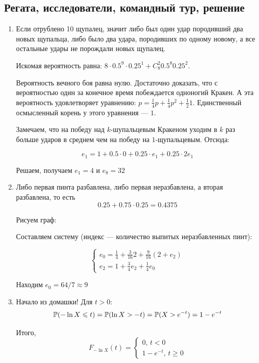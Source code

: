 \documentclass[12pt, a4paper]{article}\usepackage[]{graphicx}\usepackage[]{color}
\begin{document}
				\subsection{Регата, исследователи, командный тур, решение}

				\begin{enumerate}

					\item Если отрублено 10 щупалец, значит либо был один удар породивший два новых щупальца, либо было два удара, породивших по одному новому, а все остальные удары не порождали новых щупалец.

					Искомая вероятность равна: $8\cdot 0.5^9 \cdot 0.25^1 + C_8^2 0.5^8 0.25^2$.

					Вероятность вечного боя равна нулю. Достаточно доказать, что с вероятностью один за конечное время побеждается одноногий Кракен. А эта вероятность удовлетворяет уравнению: $p=\frac{1}{4}p + \frac{1}{4}p^2 + \frac{1}{2} 1$. Единственный осмысленный корень у этого уравнения — $1$.

					Замечаем, что на победу над $k$-шупальцевым Кракеном уходим в $k$ раз больше ударов в среднем чем на победу на $1$-щупальцевым. Отсюда:

					\[
					e_1=1 + 0.5\cdot 0 + 0.25\cdot e_1 + 0.25 \cdot 2e_1
					\]

					Решаем, получаем $e_1=4$ и $e_8=32$

					\item Либо первая пинта разбавлена, либо первая неразбавлена, а вторая разбавлена, то есть
					\[
					0.25 + 0.75\cdot 0.25 =0.4375
					\]

					Рисуем граф:


					Составляем систему (индекс — количество выпитых неразбавленных пинт):

					\[
					\begin{cases}
					e_0=\frac{1}{4} + \frac{3}{16}2 + \frac{9}{16}(2+e_2) \\
					e_2=1+\frac{3}{4}e_2 + \frac{1}{4}e_0
					\end{cases}
					\]

					Находим $e_0=64/7\approx 9$

					\item Начало из домашки! Для $t>0$:
					\[
					\P(-\ln X \leq t)=\P(\ln X > -t)=\P(X > e^{-t})=1-e^{-t}
					\]

					Итого,
					\[
					F_{-\ln X}(t)=\begin{cases}
					0, \, t < 0 \\
					1-e^{-t}, \, t \geq 0
					\end{cases}
					\]


\end{enumerate}
\end{document}
